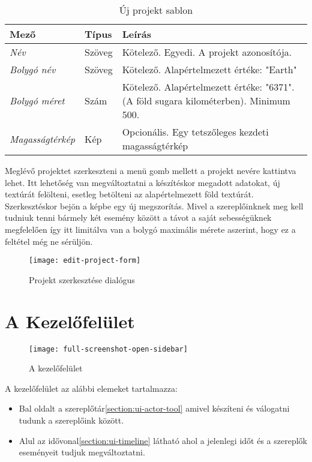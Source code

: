 \begin{table}[H]
	\centering
	\begin{tabular}{ | m{} | m{} | m{} | }
		\hline
		\textbf{Mező} & \textbf{Típus} & \textbf{Leírás} \\
		\hline \hline
		\emph{Név} & Szöveg & Kötelező. Egyedi. A projekt azonosítója. \\
		\hline
		\emph{Bolygó név} & Szöveg & Kötelező. Alapértelmezett értéke: "Earth" \\
		\hline
		\emph{Bolygó méret} & Szám & Kötelező. Alapértelmezett értéke: "6371". (A föld sugara kilométerben). Minimum 500.  \\
		\hline
		\emph{Magasságtérkép} & Kép & Opcionális. Egy tetszőleges kezdeti magasságtérkép  \\
		\hline
	\end{tabular}
	\caption{Új projekt sablon}
	\label{tab:create-project-form}
\end{table}

Meglévő projektet szerkeszteni a menü gomb mellett a projekt nevére kattintva lehet. Itt lehetőség van megváltoztatni a készítéskor megadott adatokat, új textúrát felölteni, esetleg betölteni az alapértelmezett föld textúrát. Szerkesztéskor bejön a képbe egy új megszorítás. Mivel a szereplőinknek meg kell tudniuk tenni bármely két esemény között a távot a saját sebességüknek megfelelően így itt limitálva van a bolygó maximális mérete aszerint, hogy ez a feltétel még ne sérüljön.

\begin{figure}[h!]
	\centering
	\texttt{[image: edit-project-form]}
	\caption{
		Projekt szerkesztése dialógus}
	\label{fig:create-project-form}
\end{figure}

\pagebreak

\section{A Kezelőfelület} \label{section:ui}

\begin{figure}[h!]
	\centering
	\texttt{[image: full-screenshot-open-sidebar]}
	\caption{
		A kezelőfelület}
	\label{fig:full-screenshot-open-sidebar}
\end{figure}

A kezelőfelület az alábbi elemeket tartalmazza:

\begin{itemize}
	\item Bal oldalt a szereplőtár\cref{section:ui-actor-tool} amivel készíteni és válogatni tudunk a szereplőink között.
	\item Alul az idővonal\cref{section:ui-timeline} látható ahol a jelenlegi időt és a szereplők eseményeit tudjuk megváltoztatni.
\end{itemize}

